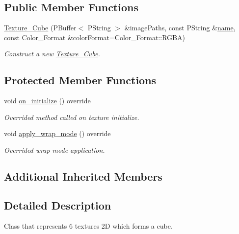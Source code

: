 \subsection*{Public Member Functions}
\begin{DoxyCompactItemize}
\item 
\mbox{\hyperlink{classprz_1_1_texture___cube_a7c064bbf36729d685bbf09125fa31acf}{Texture\+\_\+\+Cube}} (P\+Buffer$<$ P\+String $>$ \&image\+Paths, const P\+String \&\mbox{\hyperlink{classprz_1_1_texture_ad6163bf48f820adc4665d227bcd5c258}{name}}, const Color\+\_\+\+Format \&color\+Format=Color\+\_\+\+Format\+::\+R\+G\+BA)
\begin{DoxyCompactList}\small\item\em Construct a new \mbox{\hyperlink{classprz_1_1_texture___cube}{Texture\+\_\+\+Cube}}. \end{DoxyCompactList}\end{DoxyCompactItemize}
\subsection*{Protected Member Functions}
\begin{DoxyCompactItemize}
\item 
void \mbox{\hyperlink{classprz_1_1_texture___cube_a428b68f8ceb7476a5780469a40084fab}{on\+\_\+initialize}} () override
\begin{DoxyCompactList}\small\item\em Overrided method called on texture initialize. \end{DoxyCompactList}\item 
void \mbox{\hyperlink{classprz_1_1_texture___cube_aa3657f6c55bec9d78032d4b7658b3154}{apply\+\_\+wrap\+\_\+mode}} () override
\begin{DoxyCompactList}\small\item\em Overrided wrap mode application. \end{DoxyCompactList}\end{DoxyCompactItemize}
\subsection*{Additional Inherited Members}


\subsection{Detailed Description}
Class that represents 6 textures 2D which forms a cube. 



